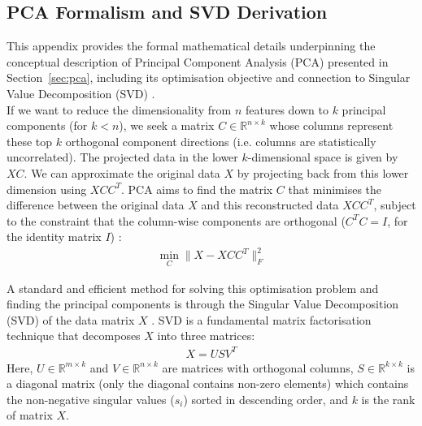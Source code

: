 \documentclass[10pt,oneside]{report}
\begin{document}


\subsection{PCA Formalism and SVD Derivation}\label{app:pca}

This appendix provides the formal mathematical details underpinning the conceptual description of Principal Component Analysis (PCA) presented in Section~\ref{sec:pca}, including its optimisation objective and connection to Singular Value Decomposition (SVD) \cite{steinberger2005text}. \\

\noindent If we want to reduce the dimensionality from $n$ features down to $k$ principal components (for $k < n$), we seek a matrix $C \in \mathbb{R}^{n \times k}$ whose columns represent these top $k$ orthogonal component directions (i.e. columns are statistically uncorrelated). The projected data in the lower $k$-dimensional space is given by $XC$. We can approximate the original data $X$ by projecting back from this lower dimension using $XCC^T$. PCA aims to find the matrix $C$ that minimises the difference between the original data $X$ and this reconstructed data $XCC^T$, subject to the constraint that the column-wise components are orthogonal ($C^TC = I$, for the identity matrix $I$) \cite{udell2016generalized}:
\begin{align}
    \min_C \| X - XCC^T \|_F^2
    \label{eq:pca_appendix} %
\end{align}

A standard and efficient method for solving this optimisation problem and finding the principal components is through the Singular Value Decomposition (SVD) of the data matrix $X$ \cite{steinberger2005text, udell2016generalized}. SVD is a fundamental matrix factorisation technique that decomposes $X$ into three matrices:
\begin{align}
    X = USV^T \label{eq:svd_appendix} %
\end{align}
Here, $U \in \mathbb{R}^{m \times k}$ and $V \in \mathbb{R}^{n \times k}$ are matrices with orthogonal columns, $S \in \mathbb{R}^{k \times k}$ is a diagonal matrix (only the diagonal contains non-zero elements) which contains the non-negative singular values ($s_i$) sorted in descending order, and $k$ is the rank of matrix $X$.
\end{document}
